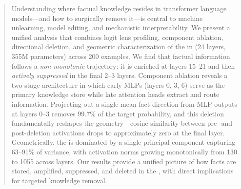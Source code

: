 \begin{abstract}
Understanding where factual knowledge resides in transformer language models---and how to surgically remove it---is central to machine unlearning, model editing, and mechanistic interpretability. We present a unified analysis that combines logit lens profiling, component ablation, directional deletion, and geometric characterization of the \residstream in \gptmed (24 layers, 355M parameters) across 200 \counterfact examples. We find that factual information follows a \emph{non-monotonic} trajectory: it is enriched at layers 15--21 and then \emph{actively suppressed} in the final 2--3 layers. Component ablation reveals a two-stage architecture in which early MLPs (layers 0, 3, 6) serve as the primary knowledge store while late attention heads extract and route information. Projecting out a single mean fact direction from MLP outputs at layers 0--3 removes 99.7\% of the target probability, and this deletion fundamentally reshapes the \residstream geometry---cosine similarity between pre- and post-deletion activations drops to approximately zero at the final layer. Geometrically, the \residstream is dominated by a single principal component capturing 63--91\% of variance, with activation norms growing monotonically from 130 to 1055 across layers. Our results provide a unified picture of how facts are stored, amplified, suppressed, and deleted in the \residstream, with direct implications for targeted knowledge removal.
\end{abstract}
